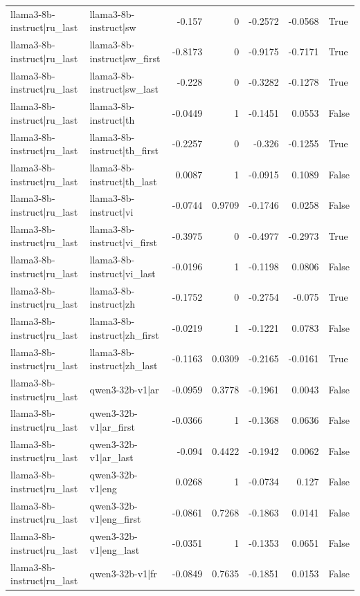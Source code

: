 \begin{table}
\begin{tabular}{l l r r r r l}
llama3-8b-instruct|ru_last & llama3-8b-instruct|sw & -0.157 & 0 & -0.2572 & -0.0568 & True \\
llama3-8b-instruct|ru_last & llama3-8b-instruct|sw_first & -0.8173 & 0 & -0.9175 & -0.7171 & True \\
llama3-8b-instruct|ru_last & llama3-8b-instruct|sw_last & -0.228 & 0 & -0.3282 & -0.1278 & True \\
llama3-8b-instruct|ru_last & llama3-8b-instruct|th & -0.0449 & 1 & -0.1451 & 0.0553 & False \\
llama3-8b-instruct|ru_last & llama3-8b-instruct|th_first & -0.2257 & 0 & -0.326 & -0.1255 & True \\
llama3-8b-instruct|ru_last & llama3-8b-instruct|th_last & 0.0087 & 1 & -0.0915 & 0.1089 & False \\
llama3-8b-instruct|ru_last & llama3-8b-instruct|vi & -0.0744 & 0.9709 & -0.1746 & 0.0258 & False \\
llama3-8b-instruct|ru_last & llama3-8b-instruct|vi_first & -0.3975 & 0 & -0.4977 & -0.2973 & True \\
llama3-8b-instruct|ru_last & llama3-8b-instruct|vi_last & -0.0196 & 1 & -0.1198 & 0.0806 & False \\
llama3-8b-instruct|ru_last & llama3-8b-instruct|zh & -0.1752 & 0 & -0.2754 & -0.075 & True \\
llama3-8b-instruct|ru_last & llama3-8b-instruct|zh_first & -0.0219 & 1 & -0.1221 & 0.0783 & False \\
llama3-8b-instruct|ru_last & llama3-8b-instruct|zh_last & -0.1163 & 0.0309 & -0.2165 & -0.0161 & True \\
llama3-8b-instruct|ru_last & qwen3-32b-v1|ar & -0.0959 & 0.3778 & -0.1961 & 0.0043 & False \\
llama3-8b-instruct|ru_last & qwen3-32b-v1|ar_first & -0.0366 & 1 & -0.1368 & 0.0636 & False \\
llama3-8b-instruct|ru_last & qwen3-32b-v1|ar_last & -0.094 & 0.4422 & -0.1942 & 0.0062 & False \\
llama3-8b-instruct|ru_last & qwen3-32b-v1|eng & 0.0268 & 1 & -0.0734 & 0.127 & False \\
llama3-8b-instruct|ru_last & qwen3-32b-v1|eng_first & -0.0861 & 0.7268 & -0.1863 & 0.0141 & False \\
llama3-8b-instruct|ru_last & qwen3-32b-v1|eng_last & -0.0351 & 1 & -0.1353 & 0.0651 & False \\
llama3-8b-instruct|ru_last & qwen3-32b-v1|fr & -0.0849 & 0.7635 & -0.1851 & 0.0153 & False \\

\end{tabular}
\end{table}
